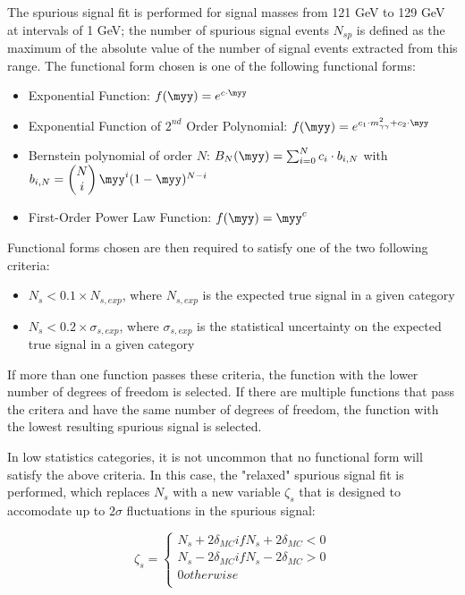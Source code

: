 The spurious signal fit is performed for signal masses from 121 GeV to 129 GeV at intervals of 1 GeV; the number of spurious signal events $N_{sp}$ is defined as the maximum of the absolute value of the number of signal events extracted from this range. The functional form chosen is one of the following functional forms:

\begin{itemize}
\item Exponential Function: $f(\myy) = e^{c\cdot \myy}$
\item Exponential Function of $2^{nd}$ Order Polynomial: $f(\myy) = e^{c_1\cdot m^2_{\gamma\gamma}+c_2\cdot \myy}$
\item Bernstein polynomial of order $N$: $B_{N}(\myy) = \sum_{i=0}^N c_i\cdot b_{i,N}$ with $b_{i,N} = \begin{pmatrix}N\\i\end{pmatrix}\myy^i (1-\myy)^{N-i}$
\item First-Order Power Law Function: $f(\myy) = \myy^c$
\end{itemize}

Functional forms chosen are then required to satisfy one of the two following criteria:

\begin{itemize}
\item $N_{s} < 0.1 \times N_{s,exp}$, where $N_{s,exp}$ is the expected true signal in a given category
\item $N_{s} < 0.2 \times \sigma_{s,exp}$, where $\sigma_{s,exp}$ is the statistical uncertainty on the expected true signal in a given category
\end{itemize}

If more than one function passes these criteria, the function with the lower number of degrees of freedom is selected. If there are multiple functions that pass the critera and have the same number of degrees of freedom, the function with the lowest resulting spurious signal is selected.

In low statistics categories, it is not uncommon that no functional form will satisfy the above criteria. In this case, the "relaxed" spurious signal fit is performed, which replaces $N_{s}$ with a new variable $\zeta_{s}$ that is designed to accomodate up to $2\sigma$ fluctuations in the spurious signal:

\[\zeta_{s} = \begin{cases} 
      N_{s} + 2 \delta_{MC} if  N_{s} + 2 \delta_{MC} < 0\\
      N_{s} - 2 \delta_{MC} if  N_{s} - 2 \delta_{MC} > 0\\
      0 otherwise \\
   \end{cases}
\]

